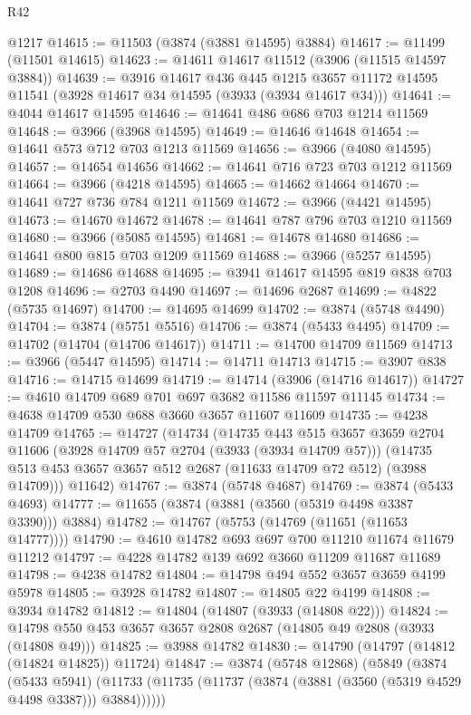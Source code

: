 \begin{lexlean}{R42}
\begin{coremodule}
    @1217
@14615 := @11503 (@3874 (@3881 @14595) @3884)
@14617 := @11499 (@11501 @14615)
@14623 := @14611 @14617 @11512 (@3906 (@11515 @14597 @3884))
@14639 := @3916
    @14617
    @436
    @445
    @1215
    @3657
    @11172
    @14595
    @11541
    (@3928 @14617 @34 @14595 (@3933 (@3934 @14617 @34)))
@14641 := @4044 @14617 @14595
@14646 := @14641 @486 @686 @703 @1214 @11569
@14648 := @3966 (@3968 @14595)
@14649 := @14646 @14648
@14654 := @14641 @573 @712 @703 @1213 @11569
@14656 := @3966 (@4080 @14595)
@14657 := @14654 @14656
@14662 := @14641 @716 @723 @703 @1212 @11569
@14664 := @3966 (@4218 @14595)
@14665 := @14662 @14664
@14670 := @14641 @727 @736 @784 @1211 @11569
@14672 := @3966 (@4421 @14595)
@14673 := @14670 @14672
@14678 := @14641 @787 @796 @703 @1210 @11569
@14680 := @3966 (@5085 @14595)
@14681 := @14678 @14680
@14686 := @14641 @800 @815 @703 @1209 @11569
@14688 := @3966 (@5257 @14595)
@14689 := @14686 @14688
@14695 := @3941 @14617 @14595 @819 @838 @703 @1208
@14696 := @2703 @4490
@14697 := @14696 @2687
@14699 := @4822 (@5735 @14697)
@14700 := @14695 @14699
@14702 := @3874 (@5748 @4490)
@14704 := @3874 (@5751 @5516)
@14706 := @3874 (@5433 @4495)
@14709 := @14702 (@14704 (@14706 @14617))
@14711 := @14700 @14709 @11569
@14713 := @3966 (@5447 @14595)
@14714 := @14711 @14713
@14715 := @3907 @838
@14716 := @14715 @14699
@14719 := @14714 (@3906 (@14716 @14617))
@14727 := @4610 @14709 @689 @701 @697 @3682 @11586 @11597 @11145
@14734 := @4638 @14709 @530 @688 @3660 @3657 @11607 @11609
@14735 := @4238 @14709
@14765 := @14727
    (@14734
      (@14735
        @443
        @515
        @3657
        @3659
        @2704
        @11606
        (@3928 @14709 @57 @2704 (@3933 (@3934 @14709 @57)))
        (@14735 @513 @453 @3657 @3657 @512 @2687 (@11633 @14709 @72 @512) (@3988 @14709)))
      @11642)
@14767 := @3874 (@5748 @4687)
@14769 := @3874 (@5433 @4693)
@14777 := @11655 (@3874 (@3881 (@3560 (@5319 @4498 @3387 @3390))) @3884)
@14782 := @14767 (@5753 (@14769 (@11651 (@11653 @14777))))
@14790 := @4610 @14782 @693 @697 @700 @11210 @11674 @11679 @11212
@14797 := @4228 @14782 @139 @692 @3660 @11209 @11687 @11689
@14798 := @4238 @14782
@14804 := @14798 @494 @552 @3657 @3659 @4199 @5978
@14805 := @3928 @14782
@14807 := @14805 @22 @4199
@14808 := @3934 @14782
@14812 := @14804 (@14807 (@3933 (@14808 @22)))
@14824 := @14798 @550 @453 @3657 @3657 @2808 @2687 (@14805 @49 @2808 (@3933 (@14808 @49)))
@14825 := @3988 @14782
@14830 := @14790 (@14797 (@14812 (@14824 @14825)) @11724)
@14847 := @3874
    (@5748 @12868)
    (@5849
      (@3874
        (@5433 @5941)
        (@11733 (@11735 (@11737 (@3874 (@3881 (@3560 (@5319 @4529 @4498 @3387))) @3884))))))

\end{coremodule}
\end{lexlean}
